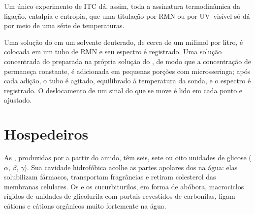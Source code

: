 Um único experimento de ITC dá, assim, toda a assinatura termodinâmica da
ligação, entalpia e entropia, que uma titulação por RMN ou por UV--visível só dá
por meio de uma série de temperaturas.

\begin{inthelab}
Uma solução do  em um solvente deuterado, de cerca de um milimol por litro,
é colocada em um tubo de RMN e seu espectro é registrado. Uma solução concentrada do
 preparada na própria solução do , de modo que a concentração de  permaneça
constante, é adicionada em pequenas porções com microsseringa; após cada adição, o
tubo é agitado, equilibrado à temperatura da sonda, e o espectro é
registrado. O deslocamento de um sinal do  que se move é lido em cada ponto e
ajustado.
\end{inthelab}

\section{Hospedeiros}

As , produzidas por  a partir do amido, têm seis, sete ou oito unidades de
glicose ($\alpha$, $\beta$, $\gamma$). Sua cavidade hidrofóbica acolhe as partes apolares dos  na
água: elas solubilizam fármacos, transportam fragrâncias e retiram colesterol das
membranas celulares. Os  e os cucurbiturilos, em forma de abóbora,
macrociclos rígidos de unidades de glicolurila com portais revestidos de carbonilas, ligam cátions e
cátions orgânicos muito fortemente na água.

